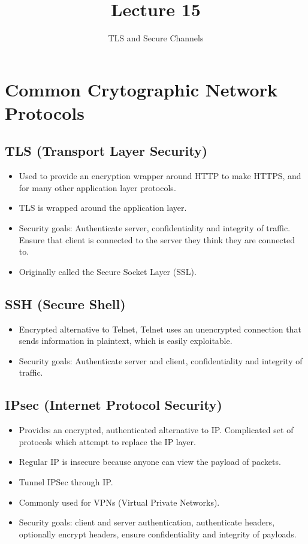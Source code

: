 \documentclass[11pt]{article} %
\title{Lecture 15}
\author{TLS and Secure Channels}
\begin{document}
\maketitle

\section{Common Crytographic Network Protocols}

\subsection{TLS (Transport Layer Security)}
\begin{itemize}
  \item  Used to provide an encryption wrapper around HTTP to make HTTPS, and for
  many other application layer protocols.
  \item TLS is wrapped around the application layer.
  \item Security goals: Authenticate server, confidentiality and integrity of
  traffic. Ensure that client is connected to the server they think they are
  connected to.
  \item Originally called the Secure Socket Layer (SSL).
\end{itemize}

\subsection{SSH (Secure Shell)}
\begin{itemize}
  \item Encrypted alternative to Telnet, Telnet uses an unencrypted connection
  that sends information in plaintext, which is easily exploitable.
  \item Security goals: Authenticate server and client, confidentiality and
  integrity of traffic.
\end{itemize}

\subsection{IPsec (Internet Protocol Security)}
\begin{itemize}
  \item Provides an encrypted, authenticated alternative to IP. Complicated set
  of protocols which attempt to replace the IP layer.
  \item Regular IP is insecure because anyone can view the payload of packets.
  \item Tunnel IPSec through IP.
  \item Commonly used for VPNs (Virtual Private Networks).
  \item Security goals: client and server authentication, authenticate headers,
  optionally encrypt headers, ensure confidentiality and integrity of payloads.
\end{itemize}
\end{document}
